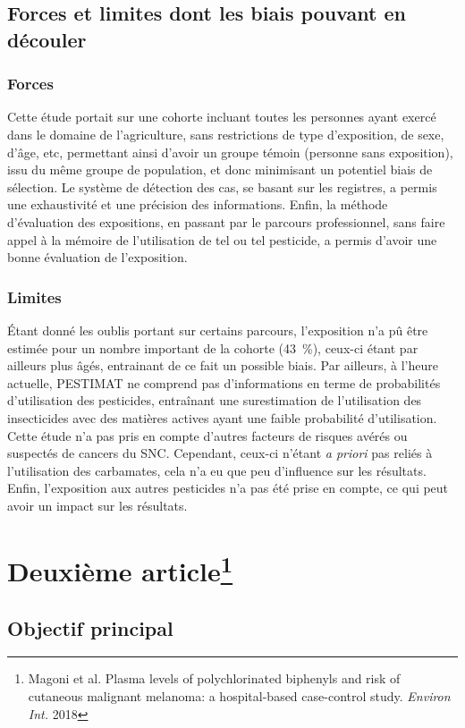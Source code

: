 \documentclass[10pt]{article}
\begin{document}
\subsection{Forces et limites dont les biais pouvant en découler}
\subsubsection*{Forces}
Cette étude portait sur une cohorte incluant toutes les personnes ayant exercé dans le domaine de l'agriculture, sans restrictions de type d'exposition, de sexe, d'âge, etc, permettant ainsi d'avoir un groupe témoin (personne sans exposition), issu du même groupe de population, et donc minimisant un potentiel biais de sélection. Le système de détection des cas, se basant sur les registres, a permis une exhaustivité et une précision des informations. Enfin, la méthode d'évaluation des expositions, en passant par le parcours professionnel, sans faire appel à la mémoire de l'utilisation de tel ou tel pesticide, a permis d'avoir une bonne évaluation de l'exposition.

\subsubsection*{Limites}
\'{E}tant donné les oublis portant sur certains parcours, l'exposition n'a pû être estimée pour un nombre important de la cohorte (43~\%), ceux-ci étant par ailleurs plus âgés, entrainant de ce fait un possible biais. Par ailleurs, à l'heure actuelle, PESTIMAT ne comprend pas d'informations en terme de probabilités d'utilisation des pesticides, entraînant une surestimation de l'utilisation des insecticides avec des matières actives ayant une faible probabilité d'utilisation. 
Cette étude n'a pas pris en compte d'autres facteurs de risques avérés ou suspectés de cancers du SNC. Cependant, ceux-ci n'étant \emph{a priori} pas reliés à l'utilisation des carbamates, cela n'a eu que peu d'influence sur les résultats. 
Enfin, l'exposition aux autres pesticides n'a pas été prise en compte, ce qui peut avoir un impact sur les résultats. 

\newpage
\section{Deuxième article\protect\footnote{Magoni et al. Plasma levels of polychlorinated biphenyls and risk of cutaneous malignant melanoma: a hospital-based case-control study. \emph{Environ Int.} 2018}}
\subsection{Objectif principal}
\end{document}
